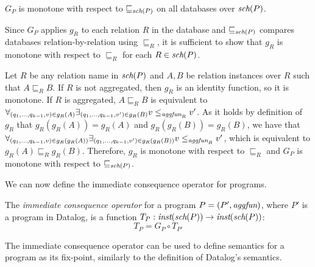 \begin{lem}\label{gpmonotonedatabase}
$G_P$ is monotone with respect to $\sqsubseteq_{\textit{sch}(P)}$ on all databases over $\textit{sch}(P)$.
\end{lem}
\begin{prof}
Since $G_P$ applies $g_R$ to each relation $R$ in the database and $\sqsubseteq_{\textit{sch}(P)}$ compares databases relation-by-relation using $\sqsubseteq_R$, it is sufficient to show that $g_R$ is monotone with respect to $\sqsubseteq_R$ for each $R \in \textit{sch}(P)$.

Let $R$ be any relation name in $\textit{sch}(P)$ and $A, B$ be relation instances over $R$ such that $A \sqsubseteq_R B$. If $R$ is not aggregated, then $g_R$ is an identity function, so it is monotone. If $R$ is aggregated, $A \sqsubseteq_R B$ is equivalent to $\forall_{(q_1, ..., q_{k-1}, v) \in g_R(A)} \exists_{(q_1, ..., q_{k-1}, v') \in g_R(B)} v \le_{\textit{aggfun}_R} v'$. As it holds by definition of $g_R$ that $g_R(g_R(A)) = g_R(A)$ and $g_R(g_R(B)) = g_R(B)$, we have that $\forall_{(q_1, ..., q_{k-1}, v) \in g_R(g_R(A))} \exists_{(q_1, ..., q_{k-1}, v') \in g_R(g_R(B))} v \le_{\textit{aggfun}_R} v'$, which is equivalent to $g_R(A) \sqsubseteq_R g_R(B)$. Therefore, $g_R$ is monotone with respect to $\sqsubseteq_R$ and $G_P$ is monotone with respect to $\sqsubseteq_{\textit{sch}(P)}$. \QEDA
\end{prof}

We can now define the immediate consequence operator for \datalogra programs.

\begin{defn}
The \emph{immediate consequence operator} for a \datalogra program $P = (P', \textit{aggfun})$, where $P'$ is a program in Datalog, is a function $T_P: \textit{inst}(\textit{sch}(P)) \to \textit{inst}(\textit{sch}(P))$:
$$T_P = G_P \circ T_{P'}$$
\end{defn}

The immediate consequence operator can be used to define semantics for a \datalogra program as its fix-point, similarly to the definition of Datalog's semantics.

